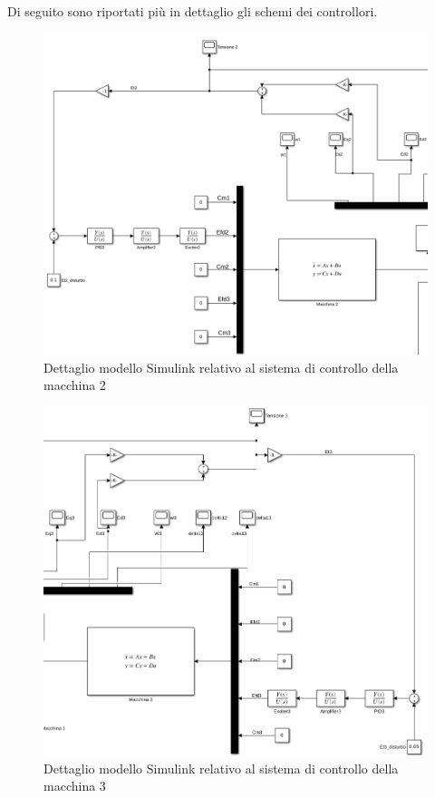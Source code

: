 \documentclass[Lau,noexaminfo]{sapthesis}
\begin{document}
	Di seguito sono riportati più in dettaglio gli schemi dei controllori.
	\begin{figure}[h]
		\centering
			\includegraphics[scale=0.45,angle=90]{Dettaglio_controllore2}
			\caption{Dettaglio modello Simulink relativo al sistema di controllo della macchina 2}
	\end{figure}
	\begin{figure}[h]
		\centering
		\includegraphics[scale=0.45,angle=-90]{dettaglio_controllore_3}
		\caption{Dettaglio modello Simulink relativo al sistema di controllo della macchina 3}
	\end{figure}
\end{document}
